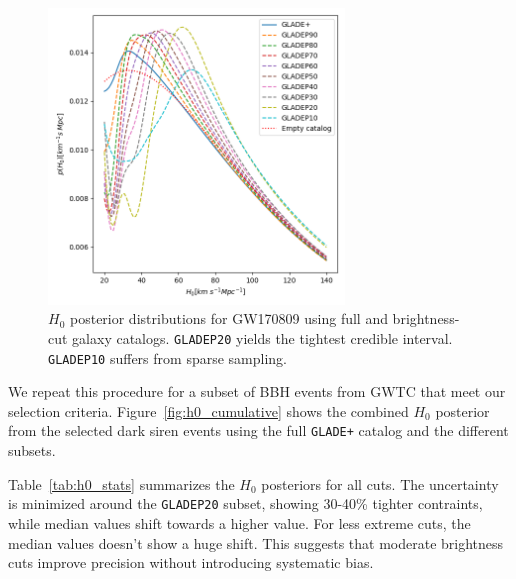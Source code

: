 \begin{figure}[ht]
    \centering
    \includegraphics[width=0.7\textwidth]{figures/GW170809_H0.png}
    \caption[$H_0$ posterior distributions for GW170809 using full and brightness-cut galaxy catalogs.]{$H_0$ posterior distributions for GW170809 using full and brightness-cut galaxy catalogs. \texttt{GLADEP20} yields the tightest credible interval. \texttt{GLADEP10} suffers from sparse sampling.}
    \label{fig:h0_gw170809}
\end{figure}

We repeat this procedure for a subset of \ac{BBH} events from \ac{GWTC} that meet our selection criteria. Figure~\ref{fig:h0_cumulative} shows the combined $H_0$ posterior from the selected dark siren events using the full \texttt{GLADE+} catalog and the different subsets.

Table~\ref{tab:h0_stats} summarizes the $H_0$ posteriors for all cuts. The uncertainty is minimized around the \texttt{GLADEP20} subset, showing 30-40\% tighter contraints, while median values shift towards a higher value. For less extreme cuts, the median values doesn't show a huge shift. This suggests that moderate brightness cuts improve precision without introducing systematic bias.

